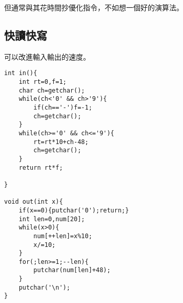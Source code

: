     \begin{tip}
        但通常與其花時間抄優化指令，不如想一個好的演算法。
    \end{tip}

    \subsection{快讀快寫}
    可以改進輸入輸出的速度。

    \begin{lstlisting}[caption=快速讀寫]
int in(){
    int rt=0,f=1;
    char ch=getchar();
    while(ch<'0' && ch>'9'){
        if(ch=='-')f=-1;
        ch=getchar();
    }
    while(ch>='0' && ch<='9'){
        rt=rt*10+ch-48;
        ch=getchar();
    }
    return rt*f;

}

void out(int x){
    if(x==0){putchar('0');return;}
    int len=0,num[20];
    while(x>0){
        num[++len]=x%10;
        x/=10;
    }
    for(;len>=1;--len){
        putchar(num[len]+48);
    }
    putchar('\n');
}\end{lstlisting}